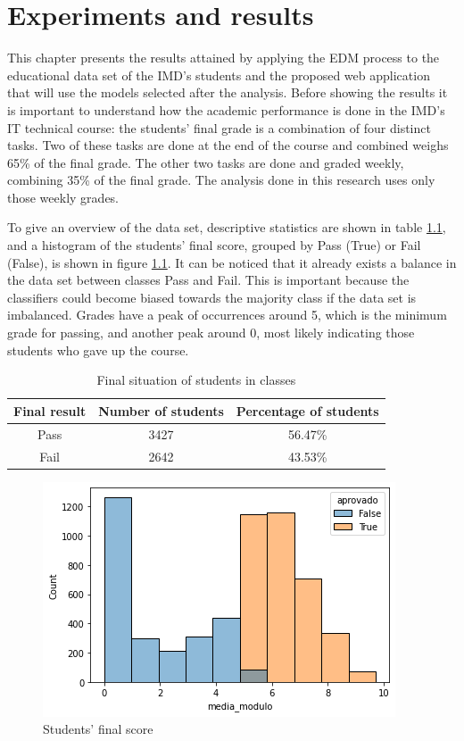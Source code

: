 \chapter{Experiments and results}
\label{ch:Experiments}

This chapter presents the results attained by applying the EDM process to the educational data set of the IMD's students and the proposed web application that will use the models selected after the analysis. Before showing the results it is important to understand how the academic performance is done in the IMD's IT technical course: the students' final grade is a combination of four distinct tasks. Two of these tasks are done at the end of the course and combined weighs 65\% of the final grade. The other two tasks are done and graded weekly, combining 35\% of the final grade. The analysis done in this research uses only those weekly grades.

To give an overview of the data set, descriptive statistics are shown in table \ref{tab:da}, and a histogram of the students' final score, grouped by Pass (True) or Fail (False), is shown in figure \ref{fig:mm}. It can be noticed that it already exists a balance in the data set between classes Pass and Fail. This is important because the classifiers could become biased towards the majority class if the data set is imbalanced. Grades have a peak of occurrences around 5, which is the minimum grade for passing, and another peak around 0, most likely indicating those students who gave up the course.

\begin{table}[ht]
\centering
\begin{tabular}{ccc} \hline
\textbf{Final result} & \textbf{Number of students} & \textbf{Percentage of students} \\ \hline
Pass                  & 3427                        & 56.47\%                         \\
Fail                  & 2642                        & 43.53\%                         \\ \hline
\end{tabular}   
\caption{Final situation of students in classes}
\label{tab:da}
\end{table}

\begin{figure}[hbt!]
	\centering
  	\includegraphics[scale=.43]{Resultados/mm.png}
  	\caption{Students' final score}
  	\label{fig:mm}
\end{figure}

